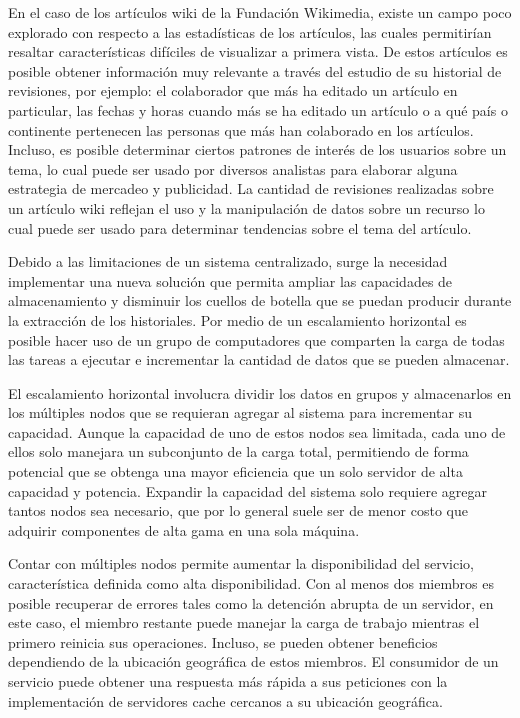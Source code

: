 En el caso de los artículos wiki de la Fundación Wikimedia, existe un campo poco
explorado con respecto a las estadísticas de los artículos, las cuales permitirían resaltar
características difíciles de visualizar a primera vista. De estos artículos es posible
obtener información muy relevante a través del estudio de su historial de revisiones, por ejemplo:
el colaborador que más ha editado un artículo en particular, las fechas y
horas cuando más se ha editado un artículo o a qué país o continente pertenecen las
personas que más han colaborado en los artículos. Incluso, es posible determinar ciertos
patrones de interés de los usuarios sobre un tema, lo cual puede ser usado por diversos
analistas para elaborar alguna estrategia de mercadeo y publicidad. La cantidad de
revisiones realizadas sobre un artículo wiki reflejan el uso y la manipulación de datos
sobre un recurso lo cual puede ser usado para determinar tendencias sobre el tema del
artículo.

Debido a las limitaciones de un sistema centralizado, surge la necesidad implementar una nueva solución
que permita ampliar las capacidades de almacenamiento y disminuir los cuellos de botella que se puedan
producir durante la extracción de los historiales. Por medio de un escalamiento horizontal
es posible hacer uso de un grupo de computadores que comparten la carga de todas las tareas a ejecutar e
incrementar la cantidad de datos que se pueden almacenar.

El escalamiento horizontal involucra dividir los datos en grupos y almacenarlos en los múltiples nodos
que se requieran agregar al sistema para incrementar su capacidad.
Aunque la capacidad de uno de estos nodos sea limitada, cada uno de ellos solo manejara un subconjunto de la carga total, permitiendo
de forma potencial que se obtenga una mayor eficiencia que un solo servidor de alta capacidad y potencia.
Expandir la capacidad del sistema solo requiere agregar tantos nodos sea necesario, que por lo general
suele ser de menor costo que adquirir componentes de alta gama en una sola máquina.

Contar con múltiples nodos permite aumentar la disponibilidad del servicio, característica
definida como alta disponibilidad.
Con al menos dos miembros es posible recuperar de errores tales como
la detención abrupta de un servidor, en este caso, el miembro restante puede manejar la carga de trabajo mientras el primero reinicia sus operaciones.
Incluso, se pueden obtener beneficios dependiendo de la ubicación geográfica de estos miembros.
El consumidor de un servicio puede obtener una respuesta más rápida a sus peticiones con la implementación de servidores cache cercanos a su ubicación geográfica.

